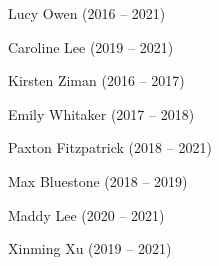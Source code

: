 \documentclass{tufte-book} %
\begin{document}
\begin{fullwidth}
\begin{multicols}{2}\raggedcolumns
  \begin{list}{\quad}{}
  \item Lucy Owen (2016 -- 2021)
  \item Caroline Lee (2019 -- 2021)
  \end{list}
  \end{multicols}

\begin{multicols}{2}\raggedcolumns
\begin{list}{\quad}{}
\item Kirsten Ziman (2016 -- 2017)
\item Emily Whitaker (2017 -- 2018)
\item Paxton Fitzpatrick (2018 -- 2021)

\end{list}
\end{multicols}


\begin{multicols}{2}\raggedcolumns
\begin{list}{\quad}{}
\item Max Bluestone (2018 -- 2019)
\item Maddy Lee (2020 -- 2021)
\item Xinming Xu (2019 -- 2021)
\end{list}
\end{multicols}



\end{fullwidth}
\end{document}
